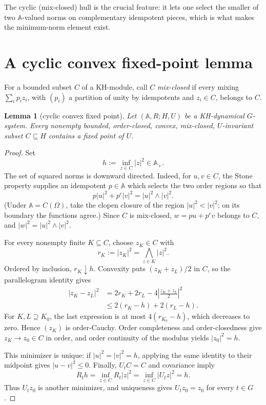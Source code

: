 \documentclass[11pt]{article}
\newtheorem{lemma}{Lemma}
\newcommand{\A}{\mathbb A}
\begin{document}
The cyclic (mix-closed) hull is the crucial feature: it lets one select the
smaller of two $\A$-valued norms on complementary idempotent pieces, which is
what makes the minimum-norm element exist.

\section{A cyclic convex fixed-point lemma}

For a bounded subset $C$ of a KH-module, call $C$ \emph{mix-closed} if
every mixing $\sum_i p_i z_i$, with $(p_i)$ a partition of unity by
idempotents and $z_i\in C$, belongs to $C$.

\begin{lemma}[cyclic convex fixed point]\label{lem:fixed}
Let $(\A,R;H,U)$ be a KH-dynamical $G$-system.  Every nonempty bounded,
order-closed, convex, mix-closed, $U$-invariant subset $C\subseteq H$
contains a fixed point of $U$.
\end{lemma}

\begin{proof}
Set
\[
 h:=\inf_{z\in C}|z|^2\in\A_+.
\]
The set of squared norms is downward directed.  Indeed, for $u,v\in C$,
the Stone property supplies an idempotent $p\in\A$ which selects the two
order regions so that
\[
 p|u|^2+p^c|v|^2=|u|^2\wedge|v|^2.
\]
(Under $\A=C(\Omega)$, take the clopen closure of the region
$|u|^2<|v|^2$; on its boundary the functions agree.)  Since $C$ is
mix-closed, $w=pu+p^cv$ belongs to $C$, and
$|w|^2=|u|^2\wedge|v|^2$.

For every nonempty finite $K\subseteq C$, choose $z_K\in C$ with
\[
 r_K:=|z_K|^2=\bigwedge_{z\in K}|z|^2.
\]
Ordered by inclusion, $r_K\downarrow h$.  Convexity puts
$(z_K+z_L)/2$ in $C$, so the parallelogram identity gives
\begin{align*}
 |z_K-z_L|^2
 &=2r_K+2r_L-4\left|\frac{z_K+z_L}{2}\right|^2\\
 &\leq 2(r_K-h)+2(r_L-h).
\end{align*}
For $K,L\supseteq K_0$, the last expression is at most
$4(r_{K_0}-h)$, which decreases to zero.  Hence $(z_K)$ is
order-Cauchy.  Order completeness and order-closedness give
$z_K\to z_0\in C$ in order, and order continuity of the modulus yields
$|z_0|^2=h$.

This minimizer is unique: if $|u|^2=|v|^2=h$, applying the same identity
to their midpoint gives $|u-v|^2\leq0$.  Finally, $U_tC=C$ and covariance
imply
\[
 R_t h
 =\inf_{z\in C}R_t|z|^2
 =\inf_{z\in C}|U_tz|^2=h.
\]
Thus $U_tz_0$ is another minimizer, and uniqueness gives
$U_tz_0=z_0$ for every $t\in G$.
\end{proof}
\end{document}
